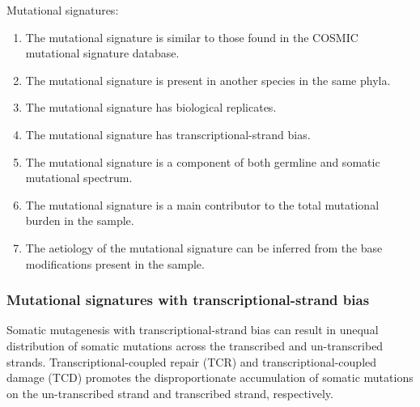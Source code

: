 \begin{description}
    \item[Mutational signatures:]
\end{description}
\begin{enumerate}
\item The mutational signature is similar to those found in the COSMIC mutational signature database.
\item The mutational signature is present in another species in the same phyla. 
\item The mutational signature has biological replicates.
\item The mutational signature has transcriptional-strand bias.
\item The mutational signature is a component of both germline and somatic mutational spectrum.
\item The mutational signature is a main contributor to the total mutational burden in the sample. 
\item The aetiology of the mutational signature can be inferred from the base modifications present in the sample. 
\end{enumerate}

%

\subsubsection{Mutational signatures with transcriptional-strand bias}

Somatic mutagenesis with transcriptional-strand bias can result in unequal distribution of somatic mutations across the transcribed and un-transcribed strands. Transcriptional-coupled repair (TCR) \cite{Svejstrup2002-wl} and transcriptional-coupled damage (TCD) \cite{Haradhvala2016-ey} promotes the disproportionate accumulation of somatic mutations on the un-transcribed strand and transcribed strand, respectively. 

